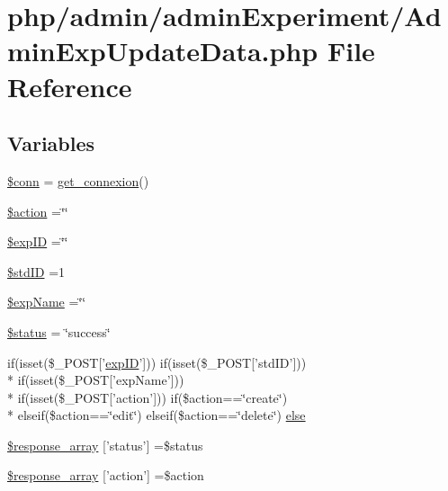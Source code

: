 \hypertarget{_admin_exp_update_data_8php}{\section{php/admin/admin\-Experiment/\-Admin\-Exp\-Update\-Data.php File Reference}
\label{_admin_exp_update_data_8php}
}
\subsection*{Variables}
\begin{DoxyCompactItemize}
\item 
\hyperlink{_admin_exp_update_data_8php_aa8a5a87b9c1a6a0819b88447cbe41877}{\$conn} = \hyperlink{php__functions_8php_ace18bc10f3fd08f92688ac743e0d8c2e}{get\-\_\-connexion}()
\item 
\hyperlink{_admin_exp_update_data_8php_aa698a3e72116e8e778be0e95d908ee30}{\$action} =\char`\"{}\char`\"{}
\item 
\hyperlink{_admin_exp_update_data_8php_ae384d32e62e85e587cd27bf249ed3db3}{\$exp\-I\-D} =\char`\"{}\char`\"{}
\item 
\hyperlink{_admin_exp_update_data_8php_a1d3cd82753ac2a11daa05848b6a2cda8}{\$std\-I\-D} =1
\item 
\hyperlink{_admin_exp_update_data_8php_a6478e66386fefd0e5fd6de22d695ffca}{\$exp\-Name} =\char`\"{}\char`\"{}
\item 
\hyperlink{_admin_exp_update_data_8php_a58391ea75f2d29d5d708d7050b641c33}{\$status} = \char`\"{}success\char`\"{}
\item 
if(isset(\$\-\_\-\-P\-O\-S\-T\mbox{[}'\hyperlink{admin_rawdata_8php_a888d53a6517f4272b5982c3ca9d16e8a}{exp\-I\-D}'\mbox{]})) if(isset(\$\-\_\-\-P\-O\-S\-T\mbox{[}'std\-I\-D'\mbox{]})) \\*
if(isset(\$\-\_\-\-P\-O\-S\-T\mbox{[}'exp\-Name'\mbox{]})) \\*
if(isset(\$\-\_\-\-P\-O\-S\-T\mbox{[}'action'\mbox{]})) if(\$action==\char`\"{}create\char`\"{}) \\*
elseif(\$action==\char`\"{}edit\char`\"{}) elseif(\$action==\char`\"{}delete\char`\"{}) \hyperlink{_admin_exp_update_data_8php_a34153a20a95674a0175d4c2447dc0a99}{else}
\item 
\hyperlink{_admin_exp_update_data_8php_acd0903a7a32e8397aefd0ce8b7dbd1ab}{\$response\-\_\-array} \mbox{[}'status'\mbox{]} =\$status
\item 
\hyperlink{_admin_exp_update_data_8php_ae768978a0cdc416c0d63d798c85c8784}{\$response\-\_\-array} \mbox{[}'action'\mbox{]} =\$action
\end{DoxyCompactItemize}


